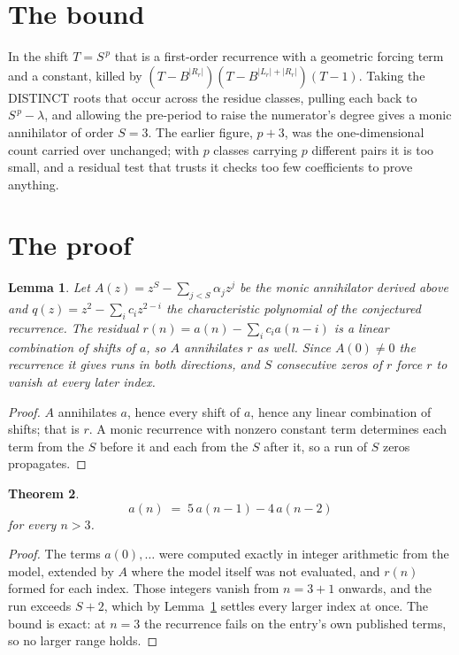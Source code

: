 \documentclass[11pt,a4paper]{article}
\theoremstyle{plain}
\newtheorem{theorem}{Theorem}
\newtheorem{lemma}[theorem]{Lemma}
\theoremstyle{definition}
\begin{document}
\section{The bound}

In the shift $T=S^{\,p}$ that is a first-order recurrence with a geometric forcing term and a
constant, killed by $(T-B^{|R_r|})(T-B^{|L_r|+|R_r|})(T-1)$. Taking the DISTINCT roots that
occur across the residue classes, pulling each back to $S^{\,p}-\lambda$, and allowing the
pre-period to raise the numerator's degree gives a monic annihilator of order $S=3$. The
earlier figure, $p+3$, was the one-dimensional count carried over unchanged; with $p$ classes
carrying $p$ different pairs it is too small, and a residual test that trusts it checks too few
coefficients to prove anything.

\section{The proof}

\begin{lemma}\label{lem:crit}
Let $A(z)=z^S-\sum_{j<S}\alpha_jz^{j}$ be the monic annihilator derived above and
$q(z)=z^{2}-\sum_ic_iz^{2-i}$ the characteristic polynomial of the conjectured
recurrence. The residual $r(n)=a(n)-\sum_ic_ia(n-i)$ is a linear combination of shifts of $a$,
so $A$ annihilates $r$ as well. Since $A(0)\ne0$ the recurrence it gives runs in both
directions, and $S$ consecutive zeros of $r$ force $r$ to vanish at every later index.
\end{lemma}

\begin{proof}
$A$ annihilates $a$, hence every shift of $a$, hence any linear combination of shifts; that is
$r$. A monic recurrence with nonzero constant term determines each term from the $S$ before it
and each from the $S$ after it, so a run of $S$ zeros propagates.
\end{proof}

\begin{theorem}
\[
a(n)\;=\;5\,a(n-1) - 4\,a(n-2)
\]
for every $n>3$.
\end{theorem}

\begin{proof}
The terms $a(0),\dots$ were computed exactly in integer arithmetic from the model, extended by
$A$ where the model itself was not evaluated, and $r(n)$ formed for each index. Those integers
vanish from $n=3+1$ onwards, and the run exceeds $S+2$, which by
Lemma~\ref{lem:crit} settles every larger index at once. The bound is exact: at $n=3$ the recurrence fails on the entry's own published terms, so no larger range holds.
\end{proof}
\end{document}
